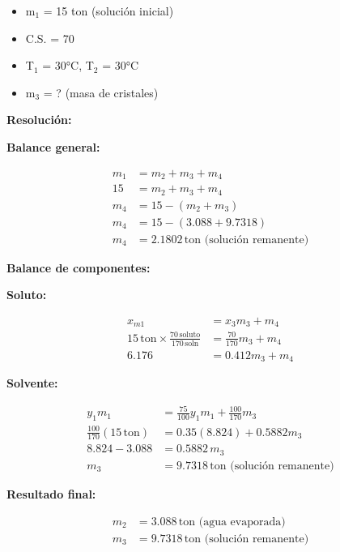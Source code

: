 \documentclass{article} %
\begin{document}
\textbf{} %
\begin{itemize}
\item m$_1$ = 15 ton (solución inicial)
\item C.S. = 70
\item T$_1$ = 30°C, T$_2$ = 30°C
\item m$_3$ = ? (masa de cristales)
\end{itemize}


\noindent\textbf{Resolución:} %

\textbf{Balance general:}

\begin{align*}
    m_1 &= m_2 + m_3 + m_4 \\[10pt]
    15 &= m_2 + m_3 + m_4 \\[10pt]
    m_4 &= 15 - (m_2 + m_3) \\[10pt]
    m_4 &= 15 - (3.088 + 9.7318) \\[10pt]
    m_4 &= 2.1802 \, \text{ton (solución remanente)}
\end{align*}

\textbf{Balance de componentes:}

\textbf{Soluto:}

\begin{align*}
    x_{m1} &= x_3 m_3 + m_4 \\[10pt]
    15 \, \text{ton} \times \frac{70 \, \text{soluto}}{170 \, \text{soln}} &= \frac{70}{170} m_3 + m_4 \\[10pt]
    6.176 &= 0.412 m_3 + m_4
\end{align*}

\textbf{Solvente:}

\begin{align*}
    y_{1}m_{1} &= \frac{75}{100}y_1 m_1 + \frac{100}{170} m_3 \\[10pt]
    \frac{100}{170} (15 \, \text{ton}) &= 0.35 (8.824) + 0.5882m_3 \\[10pt]
    8.824 - 3.088 &= 0.5882 \, m_3 \\[10pt]
    m_3 &= 9.7318 \, \text{ton (solución remanente)}
\end{align*}

\textbf{Resultado final:}

\begin{align*}
    m_2 &= 3.088 \, \text{ton (agua evaporada)} \\[10pt]
    m_3 &= 9.7318 \, \text{ton (solución remanente)}
\end{align*}
\end{document}
